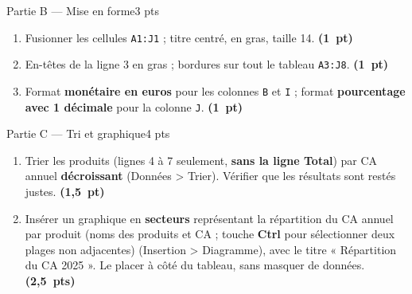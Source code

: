 \documentclass[10pt,a4paper]{article}
\newcommand{\cel}[1]{\textcolor{ipred}{\texttt{#1}}}   %
\newcommand{\pts}[1]{\hfill\mbox{\textbf{(#1)}}}
\newcommand{\menu}[1]{\textsf{\small #1}}               %
\begin{document}
\begin{partie}{Partie B — Mise en forme}{3 pts}
\begin{enumerate}[label=\textbf{B\arabic*.}]
  \item Fusionner les cellules \cel{A1:J1} ; titre centré, en gras, taille 14. \pts{1 pt}
  \item En-têtes de la ligne 3 en gras ; bordures sur tout le tableau \cel{A3:J8}. \pts{1 pt}
  \item Format \textbf{monétaire en euros} pour les colonnes \cel{B} et \cel{I} ;
        format \textbf{pourcentage avec 1 décimale} pour la colonne \cel{J}. \pts{1 pt}
\end{enumerate}
\end{partie}

\newpage
\begin{partie}{Partie C — Tri et graphique}{4 pts}
\begin{enumerate}[label=\textbf{C\arabic*.}]
  \item Trier les produits (lignes 4 à 7 seulement, \textbf{sans la ligne Total}) par CA annuel
        \textbf{décroissant} (\menu{Données > Trier}). Vérifier que les résultats sont restés justes. \pts{1,5 pt}
  \item Insérer un graphique en \textbf{secteurs} représentant la répartition du CA annuel par produit
        (noms des produits et CA ; touche \textbf{Ctrl} pour sélectionner deux plages non adjacentes)
        (\menu{Insertion > Diagramme}), avec le titre « Répartition du CA 2025 ». Le placer à côté du tableau,
        sans masquer de données. \pts{2,5 pts}
\end{enumerate}
\end{partie}
\end{document}
